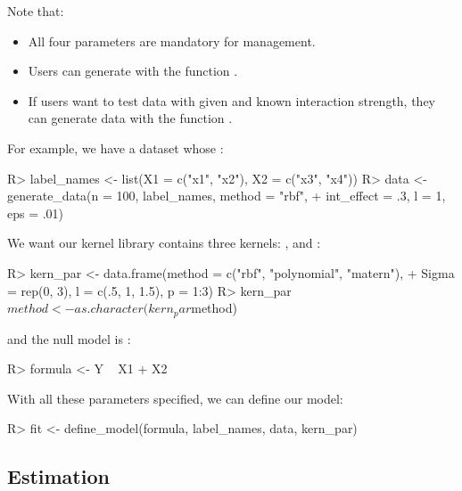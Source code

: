 \documentclass[article]{jss}
\begin{document}
Note that:
\begin{itemize}
  \item All four parameters are mandatory for management.
  \item Users can generate  with the function .
  \item If users want to test data with given and known interaction strength, they can generate data with the function .
\end{itemize}

For example, we have a dataset whose :
\begin{CodeChunk}
\begin{CodeInput}
R> label_names <- list(X1 = c("x1", "x2"), X2 = c("x3", "x4"))
R> data <- generate_data(n = 100, label_names, method = "rbf", 
+    int_effect = .3, l = 1, eps = .01)
\end{CodeInput}
\end{CodeChunk}

We want our kernel library contains three kernels: ,  and :
\begin{CodeChunk}
\begin{CodeInput}
R> kern_par <- data.frame(method = c("rbf", "polynomial", "matern"), 
+    Sigma = rep(0, 3), l = c(.5, 1, 1.5), p = 1:3)
R> kern_par$method <- as.character(kern_par$method)
\end{CodeInput}
\end{CodeChunk}
and the null model is :
\begin{CodeChunk}
\begin{CodeInput}
R> formula <- Y ~ X1 + X2
\end{CodeInput}
\end{CodeChunk}

With all these parameters specified, we can define our model:
\begin{CodeChunk}
\begin{CodeInput}
R> fit <- define_model(formula, label_names, data, kern_par)
\end{CodeInput}
\end{CodeChunk}

\subsection{Estimation}
\end{document}
